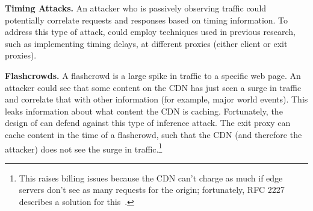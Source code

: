 \textbf{Timing Attacks.} An attacker who is passively observing traffic could potentially 
correlate requests and responses based on timing information.  To address this type of attack, 
\system{} could employ techniques used in previous research, such as implementing timing 
delays, at different proxies (either client or exit proxies).


\textbf{Flashcrowds.}  A flashcrowd is a large spike in traffic to a specific web
page. An attacker
could see that some content on the CDN has just seen a surge in traffic and correlate that with 
other information (for example, major world events).  This leaks information about what content the 
CDN is caching.  Fortunately, the design of \system{} can defend against this type of inference attack.  
The exit proxy can cache content in the time of a flashcrowd, such that the CDN (and therefore the attacker) 
does not see the surge in traffic.\footnote{This raises billing issues because the CDN can’t charge as much if edge servers don’t see as many requests for the origin; fortunately, RFC 2227 describes a solution for this~\cite{rfc2227}.}  
